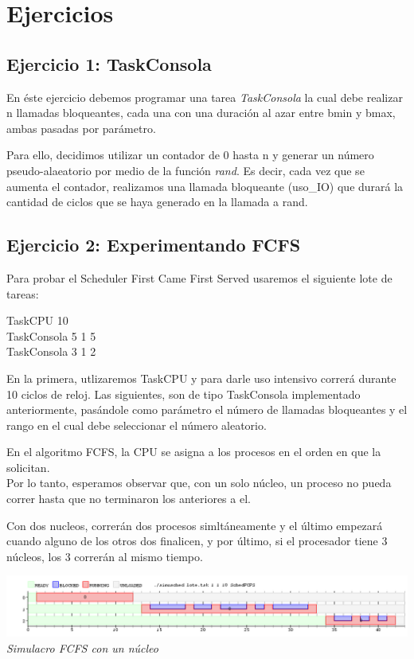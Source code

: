\section{Ejercicios}

\subsection{Ejercicio 1: TaskConsola}
En \'este ejercicio debemos programar una tarea \textit{TaskConsola} la cual debe realizar n llamadas bloqueantes, cada una con 
una duraci\'on al azar entre bmin y bmax, ambas pasadas por par\'ametro.

Para ello, decidimos utilizar un contador de 0 hasta n y generar un n\'umero pseudo-alaeatorio por medio de la 
funci\'on \textit{rand}. Es decir, cada vez que se aumenta el contador, realizamos una llamada bloqueante (uso\_IO) 
que durar\'a la cantidad de ciclos que se haya generado en la llamada a rand.

\subsection{Ejercicio 2: Experimentando FCFS}
Para probar el Scheduler First Came First Served usaremos el siguiente lote de tareas:

\begin{center}
TaskCPU 10\\
TaskConsola 5 1 5\\
TaskConsola 3 1 2
\end{center}

En la primera, utlizaremos TaskCPU y para darle uso intensivo correr\'a durante 10 ciclos de reloj.
Las siguientes, son de tipo TaskConsola implementado anteriormente, pas\'andole como par\'ametro el n\'umero de llamadas 
bloqueantes y el rango en el cual debe seleccionar el n\'umero aleatorio.

En el algoritmo FCFS, la CPU se asigna a los procesos en el orden en que la solicitan.\\
Por lo tanto, esperamos observar que, con un solo n\'ucleo, un proceso no pueda correr 
hasta que no terminaron los anteriores a el.

Con dos nucleos, correr\'an dos procesos simlt\'aneamente y el \'ultimo empezar\'a cuando alguno de los otros dos finalicen,
y por \'ultimo, si el procesador tiene 3 n\'ucleos, los 3 correr\'an al mismo tiempo.

\vspace{\baselineskip}
\begin{center}
\includegraphics[scale=0.45]{../tp1/Test/resEj2Co1.png}
\\
\vspace{1pt}
\footnotesize\textit{Simulacro FCFS con un n\'ucleo}
\end{center}
\vspace{\baselineskip}


